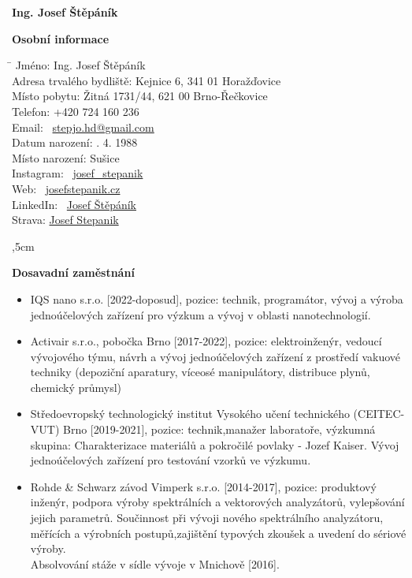 \documentclass[12pt]{article}
\begin{document}
\begin{center}
\textbf{\LARGE Ing. Josef Štěpáník} \\
\end{center}

\textbf{Osobní informace} 

\begin{tabbing}
    \hspace{6cm}\= \kill
    Jméno: \> Ing. Josef Štěpáník \\
    Adresa trvalého bydliště: \> Kejnice 6, 341 01 Horažďovice \\
    Místo pobytu: \> Žitná 1731/44, 621 00 Brno-Řečkovice \\
    Telefon: \> +420 724 160 236 \\
    Email: \> \faEnvelope \ \href{mailto:stepjo.hd@gmail.com}{stepjo.hd@gmail.com} \\
    Datum narození: . 4. 1988 \\
    Místo narození: \> Sušice \\
    Instagram: \>  \faInstagram \ \href{https://www.instagram.com/josef_stepanik/}{josef\_stepanik} \\
    Web: \>  \faGlobe \ \href{https://www.josefstepanik.cz/}{josefstepanik.cz} \\
    LinkedIn: \>  \faLinkedin \ \href{https://www.linkedin.com/in/josef-štěpáník-30106174/}{Josef Štěpáník} \\
    Strava: \>  \href{https://www.strava.com/athletes/40559859}{Josef Stepanik} \\
\end{tabbing}

\noindent\hrulefill
{},5cm

\textbf{Dosavadní zaměstnání}

\begin{itemize}
\item IQS nano s.r.o. [2022-doposud], pozice: technik, programátor, vývoj a výroba jednoúčelových zařízení pro výzkum a vývoj v oblasti nanotechnologií.


\item Activair s.r.o., pobočka Brno [2017-2022], pozice: elektroinženýr, vedoucí vývojového týmu, návrh a vývoj jednoúčelových zařízení z prostředí vakuové techniky (depoziční aparatury, víceosé manipulátory, distribuce plynů, chemický průmysl) 

\item 
Středoevropský technologický institut Vysokého učení technického 
(CEITEC-VUT) Brno [2019-2021], pozice: technik,manažer laboratoře,  výzkumná skupina: Charakterizace materiálů a pokročilé povlaky - Jozef Kaiser. 
Vývoj jednoúčelových zařízení pro testování vzorků ve výzkumu. 

\item Rohde \& Schwarz závod Vimperk s.r.o. [2014-2017], pozice: produktový inženýr, podpora výroby spektrálních a vektorových analyzátorů, vylepšování jejich parametrů. Součinnost při vývoji nového spektrálního analyzátoru, měřících a výrobních postupů,zajištění typových zkoušek a uvedení do sériové výroby. \\
Absolvování stáže v sídle vývoje v Mnichově [2016].
 
\end{itemize}
\end{document}
